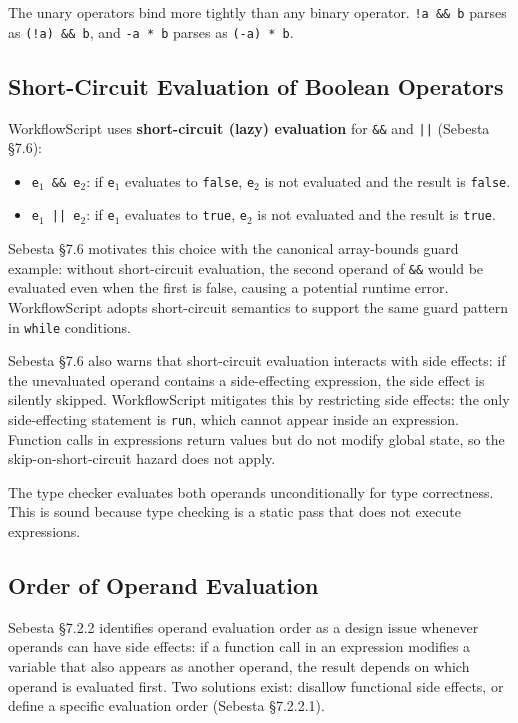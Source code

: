 \documentclass[10pt,a4paper]{article}
\begin{document}
The unary operators bind more tightly than any binary operator. \texttt{!a \&\& b} parses
as \texttt{(!a) \&\& b}, and \texttt{-a * b} parses as \texttt{(-a) * b}.

\subsection{Short-Circuit Evaluation of Boolean Operators}

WorkflowScript uses \textbf{short-circuit (lazy) evaluation} for \texttt{\&\&} and
\texttt{||} (Sebesta \S7.6):

\begin{itemize}
    \item \texttt{e$_1$ \&\& e$_2$}: if \texttt{e$_1$} evaluates to \texttt{false},
          \texttt{e$_2$} is not evaluated and the result is \texttt{false}.
    \item \texttt{e$_1$ || e$_2$}: if \texttt{e$_1$} evaluates to \texttt{true},
          \texttt{e$_2$} is not evaluated and the result is \texttt{true}.
\end{itemize}

Sebesta \S7.6 motivates this choice with the canonical array-bounds guard example: without
short-circuit evaluation, the second operand of \texttt{\&\&} would be evaluated even when
the first is false, causing a potential runtime error. WorkflowScript adopts short-circuit
semantics to support the same guard pattern in \texttt{while} conditions.

Sebesta \S7.6 also warns that short-circuit evaluation interacts with side effects: if the
unevaluated operand contains a side-effecting expression, the side effect is silently skipped.
WorkflowScript mitigates this by restricting side effects: the only side-effecting statement
is \texttt{run}, which cannot appear inside an expression. Function calls in expressions
return values but do not modify global state, so the skip-on-short-circuit hazard does not
apply.

The type checker evaluates both operands unconditionally for type correctness. This is sound
because type checking is a static pass that does not execute expressions.

\subsection{Order of Operand Evaluation}

Sebesta \S7.2.2 identifies operand evaluation order as a design issue whenever operands can
have side effects: if a function call in an expression modifies a variable that also appears
as another operand, the result depends on which operand is evaluated first. Two solutions
exist: disallow functional side effects, or define a specific evaluation order
(Sebesta \S7.2.2.1).
\end{document}
